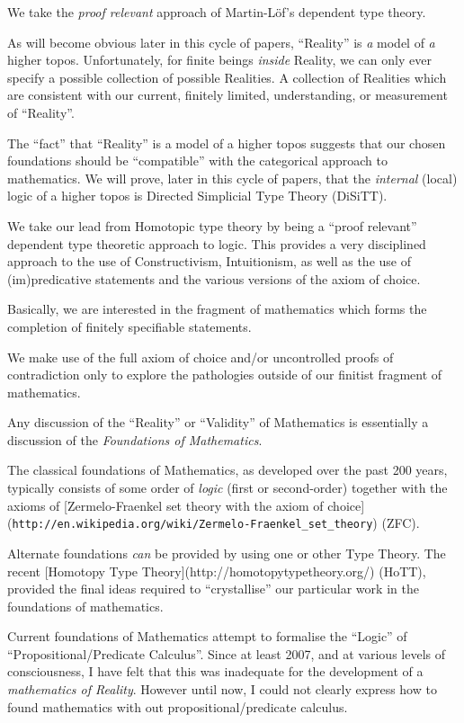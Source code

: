 \documentclass[a4paper,openany]{amsbook}
\begin{document}
We take the \emph{proof relevant} approach of Martin-L\"of's dependent type
theory.

As will become obvious later in this cycle of papers, ``Reality'' is \emph{a}
model of \emph{a} higher topos.  Unfortunately, for finite beings \emph{inside}
Reality, we can only ever specify a possible collection of possible Realities. A
collection of Realities which are consistent with our current, finitely limited,
understanding, or measurement of ``Reality''.

The ``fact'' that ``Reality'' is a model of a higher topos suggests that our
chosen foundations should be ``compatible'' with the categorical approach to
mathematics. We will prove, later in this cycle of papers, that the
\emph{internal} (local) logic of a higher topos is Directed Simplicial Type
Theory (DiSiTT).

We take our lead from Homotopic type theory by being a ``proof relevant''
dependent type theoretic approach to logic. This provides a very disciplined
approach to the use of Constructivism, Intuitionism, as well as the use of
(im)predicative statements and the various versions of the axiom of choice.

Basically, we are interested in the fragment of mathematics which forms the
completion of finitely specifiable statements.

We make use of the full axiom of choice and/or uncontrolled proofs of
contradiction only to explore the pathologies outside of our finitist fragment
of mathematics.

Any discussion of the ``Reality'' or ``Validity'' of Mathematics is essentially
a discussion of the \textit{Foundations of Mathematics}.

The classical foundations of Mathematics, as developed over the past 200 years,
typically consists of some order of \emph{logic} (first or second-order)
together with the axioms of [Zermelo-Fraenkel set theory with the axiom of
choice](\verb|http://en.wikipedia.org/wiki/Zermelo-Fraenkel_set_theory|) (ZFC).

Alternate foundations \emph{can} be provided by using one or other Type Theory.
The recent [Homotopy Type Theory](http://homotopytypetheory.org/) (HoTT),
provided the final ideas required to ``crystallise'' our particular work in the
foundations of mathematics.

Current foundations of Mathematics attempt to formalise the ``Logic'' of
``Propositional/Predicate Calculus''.  Since at least 2007, and at various
levels of consciousness, I have felt that this was inadequate for the
development of a \textit{mathematics of Reality}.  However until now, I could
not clearly express how to found mathematics with out propositional/predicate
calculus.
\end{document}
